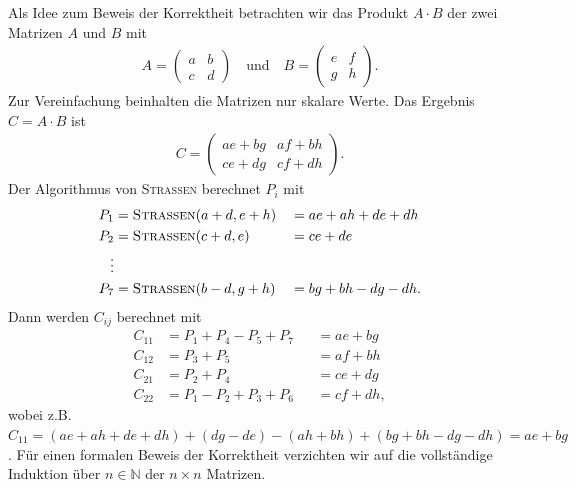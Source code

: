 \documentclass{scrartcl}
\begin{document}
Als Idee zum Beweis der Korrektheit betrachten wir das Produkt $A \cdot B$ der zwei Matrizen $A$ und $B$ mit
\begin{align*}
	A = \begin{pmatrix} a & b \\ c & d \end{pmatrix} \quad \text{und} \quad B = \begin{pmatrix} e & f \\ g & h \end{pmatrix}.
\end{align*}
Zur Vereinfachung beinhalten die Matrizen nur skalare Werte. Das Ergebnis $C = A \cdot B$ ist
\begin{align*}
	C = \begin{pmatrix} ae + bg & af + bh \\ ce + dg & cf + dh \end{pmatrix}.
\end{align*}
Der Algorithmus von \textsc{Strassen} berechnet $P_i$ mit
\begin{align*}
	P_1 &= \textsc{Strassen}(a + d, e + h) && = ae + ah + de + dh\\
	P_2 &= \textsc{Strassen}(c + d, e) && = ce + de \\
	\vdots \\
	P_7 &= \textsc{Strassen}(b - d, g + h) && = bg + bh - dg - dh.
\end{align*}
Dann werden $C_{ij}$ berechnet mit
\begin{align*}
	C_{11} & = P_1 + P_4 - P_5 + P_7 && = ae + bg\\
	C_{12} & = P_3 + P_5 && = af + bh\\
	C_{21} & = P_2 + P_4 && = ce + dg\\
	C_{22} & = P_1 - P_2 + P_3 + P_6 && = cf + dh,
\end{align*}
wobei z.B. $ C_{11} = (ae + ah + de + dh) + (dg - de) - (ah + bh) + (bg + bh - dg - dh) = ae + bg$. Für einen formalen Beweis der Korrektheit verzichten wir auf die vollständige Induktion über $n \in \mathbb{N}$ der $n \times n$ Matrizen.
\end{document}
